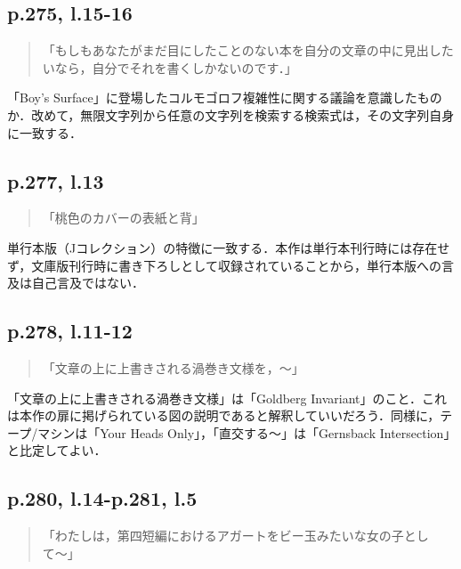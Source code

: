 \documentclass[10pt, a5paper, twoside]{ltjsarticle}
\begin{document}
        \subsection{p.275, l.15-16}

            \begin{quote}
                「もしもあなたがまだ目にしたことのない本を自分の文章の中に見出したいなら，自分でそれを書くしかないのです．」
            \end{quote}

            「Boy's Surface」に登場したコルモゴロフ複雑性に関する議論を意識したものか．改めて，無限文字列から任意の文字列を検索する検索式は，その文字列自身に一致する．

        \subsection{p.277, l.13}

            \begin{quote}
                「桃色のカバーの表紙と背」
            \end{quote}

            単行本版（Jコレクション）\cite{boysj}の特徴に一致する．本作は単行本刊行時には存在せず，文庫版刊行時に書き下ろしとして収録されていることから，単行本版への言及は自己言及ではない．

        \subsection{p.278, l.11-12}

            \begin{quote}
                「文章の上に上書きされる渦巻き文様を，〜」
            \end{quote}

            「文章の上に上書きされる渦巻き文様」は「Goldberg Invariant」のこと．これは本作の扉に掲げられている図の説明であると解釈していいだろう．同様に，テープ/マシンは「Your Heads Only」，「直交する〜」は「Gernsback Intersection」と比定してよい．

        \subsection{p.280, l.14-p.281, l.5}

            \begin{quote}
                「わたしは，第四短編におけるアガートをビー玉みたいな女の子として〜」
            \end{quote}
\end{document}
